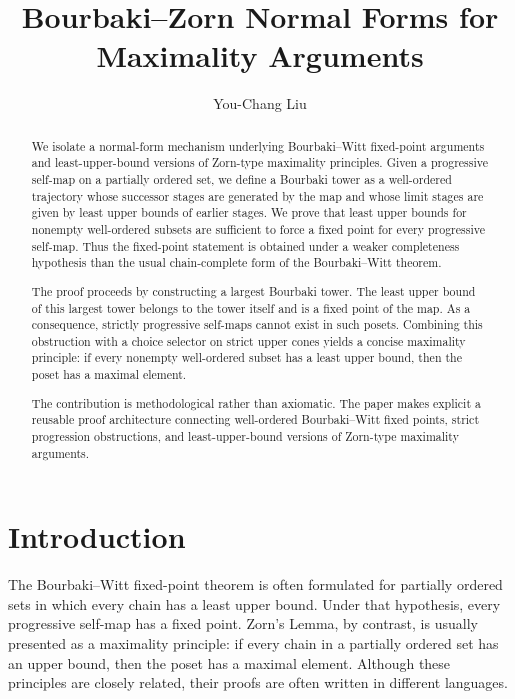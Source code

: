 \documentclass[11pt]{article}
\title{
Bourbaki--Zorn Normal Forms for Maximality Arguments
}
\author{You-Chang Liu}
\date{}
\theoremstyle{definition}
\theoremstyle{remark}
\begin{document}
\maketitle

\begin{abstract}
We isolate a normal-form mechanism underlying Bourbaki--Witt fixed-point arguments and
least-upper-bound versions of Zorn-type maximality principles. Given a progressive
self-map on a partially ordered set, we define a Bourbaki tower as a well-ordered
trajectory whose successor stages are generated by the map and whose limit stages are
given by least upper bounds of earlier stages. We prove that least upper bounds for
nonempty well-ordered subsets are sufficient to force a fixed point for every progressive
self-map. Thus the fixed-point statement is obtained under a weaker completeness
hypothesis than the usual chain-complete form of the Bourbaki--Witt theorem.

The proof proceeds by constructing a largest Bourbaki tower. The least upper bound of
this largest tower belongs to the tower itself and is a fixed point of the map. As a
consequence, strictly progressive self-maps cannot exist in such posets. Combining this
obstruction with a choice selector on strict upper cones yields a concise maximality
principle: if every nonempty well-ordered subset has a least upper bound, then the poset
has a maximal element.

The contribution is methodological rather than axiomatic. The paper makes explicit a
reusable proof architecture connecting well-ordered Bourbaki--Witt fixed points, strict
progression obstructions, and least-upper-bound versions of Zorn-type maximality
arguments.
\end{abstract}

\tableofcontents

\section{Introduction}

The Bourbaki--Witt fixed-point theorem is often formulated for partially ordered sets in
which every chain has a least upper bound. Under that hypothesis, every progressive
self-map has a fixed point. Zorn's Lemma, by contrast, is usually presented as a
maximality principle: if every chain in a partially ordered set has an upper bound, then
the poset has a maximal element. Although these principles are closely related, their
proofs are often written in different languages.
\end{document}
